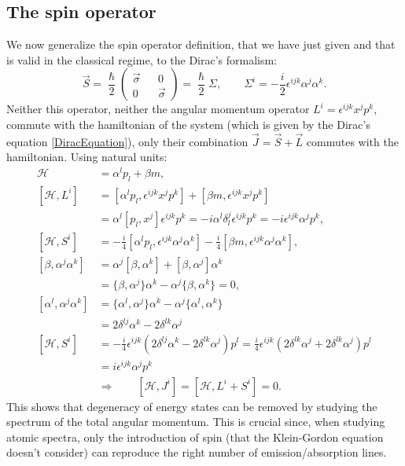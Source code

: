 \subsection{The spin operator}
We now generalize the spin operator definition, that we have just given and that is valid in the classical regime, to the Dirac's formalism:
\begin{equation*}
    \vec S=\frac{\hslash}{2}\begin{pmatrix}
        \vec\sigma&&0\\0&&\vec\sigma
    \end{pmatrix}=\frac{\hslash}{2}\Sigma,\qquad\Sigma^i=-\frac{i}{2}\epsilon^{ijk}\alpha^j\alpha^k.
\end{equation*}
Neither this operator, neither the angular momentum operator $L^i=\epsilon^{ijk}x^jp^k$, commute with the hamiltonian of the system (which is given by the Dirac's equation \eqref{DiracEquation}), only their combination $\vec J=\vec S+\vec L$ commutes with the hamiltonian. Using natural units:
\begin{align*}
    \mathcal{H} &=\alpha^l p_l+\beta m,\\
    [\mathcal{H},L^i]&=[\alpha^l p_l,\epsilon^{ijk}x^jp^k]+ [\beta m,\epsilon^{ijk}x^jp^k]\\&=\alpha^l[ p_l,x^j]\epsilon^{ijk}p^k=-i\alpha^l\delta_l^j\epsilon^{ijk}p^k=-i\epsilon^{ijk}\alpha^jp^k,\\
    [\mathcal{H},S^i]&=-\frac{i}{4}[\alpha^l p_l,\epsilon^{ijk}\alpha^j\alpha^k]- \frac{i}{4}[\beta m,\epsilon^{ijk}\alpha^j\alpha^k],\\
    [\beta ,\alpha^j\alpha^k]&=\alpha^j[\beta ,\alpha^k]+[\beta,\alpha^j]\alpha^k\\&=\{\beta ,\alpha^j\}\alpha^k-\alpha^j\{\beta ,\alpha^k\}=0,\\
    [\alpha^l ,\alpha^j\alpha^k]&=\{\alpha^l ,\alpha^j\}\alpha^k-\alpha^j\{\alpha^l, \alpha^k\}\\&=2\delta^{lj}\alpha^k-2\delta^{lk}\alpha^j\\
    [\mathcal{H},S^i]&=-\frac{i}{4}\epsilon^{ijk}(2\delta^{lj}\alpha^k-2\delta^{lk}\alpha^j)p^l=\frac{i}{4}\epsilon^{ijk}(2\delta^{lk}\alpha^j+2\delta^{lk}\alpha^j)p^l\\&=i\epsilon^{ijk}\alpha^jp^k\\
    &\Rightarrow\qquad[\mathcal{H},J^i]=[\mathcal{H},L^i+S^i]=0.
\end{align*}
This shows that degeneracy of energy states can be removed by studying the spectrum of the total angular momentum. This is crucial since, when  studying atomic spectra, only the introduction of spin (that the Klein-Gordon equation doesn't consider) can reproduce the right number of emission/absorption lines.
